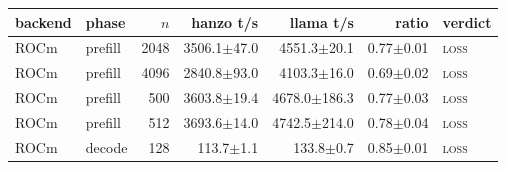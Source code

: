 \begin{tabular}{@{}llrrrrl@{}}
\toprule
backend & phase & $n$ & hanzo t/s & llama t/s & ratio & verdict \\
\midrule
ROCm & prefill & 2048 & 3506.1$\pm$47.0 & 4551.3$\pm$20.1 & 0.77$\pm$0.01 & \textsc{loss} \\
ROCm & prefill & 4096 & 2840.8$\pm$93.0 & 4103.3$\pm$16.0 & 0.69$\pm$0.02 & \textsc{loss} \\
ROCm & prefill & 500 & 3603.8$\pm$19.4 & 4678.0$\pm$186.3 & 0.77$\pm$0.03 & \textsc{loss} \\
ROCm & prefill & 512 & 3693.6$\pm$14.0 & 4742.5$\pm$214.0 & 0.78$\pm$0.04 & \textsc{loss} \\
ROCm & decode & 128 & 113.7$\pm$1.1 & 133.8$\pm$0.7 & 0.85$\pm$0.01 & \textsc{loss} \\
\bottomrule
\end{tabular}
